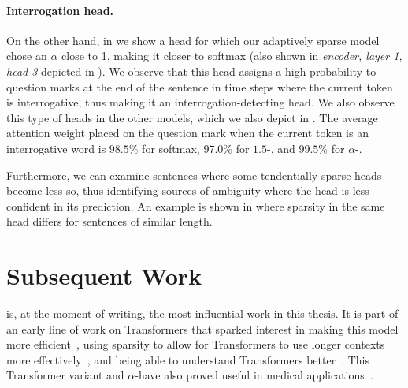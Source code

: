 \paragraph*{Interrogation head.}
On the other hand, in  we show a head for which our
adaptively sparse model chose an $\alpha$ close to 1, making it
closer to softmax (also shown in {\it encoder, layer 1, head 3}
depicted in ). We observe that this head
assigns a high probability to question marks at the end of the
sentence in time steps where the current token is interrogative, thus
making it an interrogation-detecting head. We also observe this type
of heads in the other models, which we also depict in
. The average attention weight placed on the
question mark when the current token is an interrogative word is
$98.5\%$ for softmax, $97.0\%$ for $1.5$-\entmaxtext, and $99.5\%$
for $\alpha$-\entmaxtext.

Furthermore, we can examine sentences where some tendentially sparse
heads become less so, thus identifying sources of ambiguity where the
head is less confident in its prediction. An example is shown in
 where sparsity in the same head differs
for sentences of similar length.

\section{Subsequent Work}\label{sec:subsequent_work_adapt}

\citet{correia2019adaptively} is, at the moment of writing, the most
influential work in this thesis. It is part of an early line of work
on Transformers that sparked interest in making this model more
efficient~\citep[\textit{inter
        alia}]{daras2020SMYRFEfficientAttention,
    li2020SACAcceleratingStructuring, merrill2021EffectsParameterNorm,
    roy2021EfficientContentBasedSparse}, using sparsity to allow for
Transformers to use longer contexts more
effectively~\citep[\textit{inter alia}]{jiang2020LongDocumentRanking,
    qiu2020BlockwiseSelfAttentionLong, sukhbaatar2021NotAllMemories}, and
being able to understand Transformers better~\citep[\textit{inter
        alia}]{you2020HardCodedGaussianAttention,
    rogers2020PrimerBERTologyWhat, pande2021headshypothesisunifying}.
This Transformer variant and $\alpha$-\entmaxtext have also proved
useful in medical applications~\citep{guo2020LearningLatentForests,
    yun2021SpecTrSpectralTransformer}.

